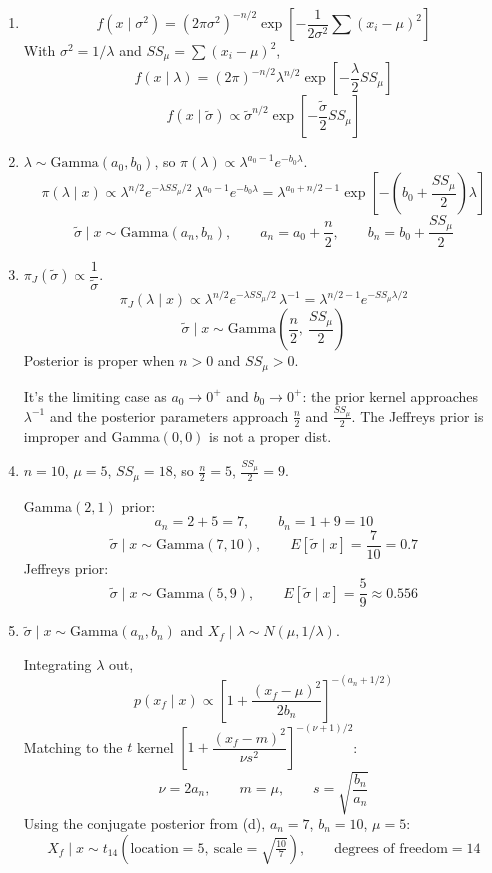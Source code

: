 \documentclass[11pt]{article}
\begin{document}
\begin{enumerate}
\item
\[
f(x \mid \sigma^2) = (2\pi\sigma^2)^{-n/2}\exp\left[-\frac{1}{2\sigma^2}\sum (x_i - \mu)^2\right]
\]
With $\sigma^2 = 1/\lambda$ and $SS_\mu = \sum (x_i - \mu)^2$,
\[
f(x \mid \lambda) = (2\pi)^{-n/2}\lambda^{n/2}\exp\left[-\frac{\lambda}{2}SS_\mu\right]
\]
\[
\boxed{f(x \mid \tilde\sigma) \propto \tilde\sigma^{n/2}\exp\left[-\frac{\tilde\sigma}{2}SS_\mu\right]}
\]

\item $\lambda \sim \text{Gamma}(a_0, b_0)$, so $\pi(\lambda) \propto \lambda^{a_0 - 1}e^{-b_0\lambda}$.
\[
\pi(\lambda \mid x) \propto \lambda^{n/2}e^{-\lambda SS_\mu/2}\,\lambda^{a_0-1}e^{-b_0\lambda}
= \lambda^{a_0 + n/2 - 1}\exp\left[-\left(b_0 + \frac{SS_\mu}{2}\right)\lambda\right]
\]
\[
\tilde\sigma \mid x \sim \text{Gamma}(a_n, b_n), \qquad
\boxed{a_n = a_0 + \frac{n}{2}, \qquad b_n = b_0 + \frac{SS_\mu}{2}}
\]

\item $\pi_J(\tilde\sigma) \propto \dfrac{1}{\tilde\sigma}$.
\[
\pi_J(\lambda \mid x) \propto \lambda^{n/2}e^{-\lambda SS_\mu/2}\,\lambda^{-1} = \lambda^{n/2 - 1}e^{-SS_\mu\lambda/2}
\]
\[
\boxed{\tilde\sigma \mid x \sim \text{Gamma}\left(\frac{n}{2},\ \frac{SS_\mu}{2}\right)}
\]
Posterior is proper when $n > 0$ and $SS_\mu > 0$.

It's the limiting case as $a_0 \to 0^+$ and $b_0 \to 0^+$: the prior kernel approaches $\lambda^{-1}$ and the posterior parameters approach $\frac{n}{2}$ and $\frac{SS_\mu}{2}$. The Jeffreys prior is improper and Gamma$(0,0)$ is not a proper dist.

\item $n = 10$, $\mu = 5$, $SS_\mu = 18$, so $\frac{n}{2} = 5$, $\frac{SS_\mu}{2} = 9$.

Gamma$(2,1)$ prior:
\[
a_n = 2 + 5 = 7, \qquad b_n = 1 + 9 = 10
\]
\[
\boxed{\tilde\sigma \mid x \sim \text{Gamma}(7, 10)}, \qquad \boxed{E[\tilde\sigma \mid x] = \frac{7}{10} = 0.7}
\]
Jeffreys prior:
\[
\boxed{\tilde\sigma \mid x \sim \text{Gamma}(5, 9)}, \qquad \boxed{E[\tilde\sigma \mid x] = \frac{5}{9} \approx 0.556}
\]

\item $\tilde\sigma \mid x \sim \text{Gamma}(a_n, b_n)$ and $X_f \mid \lambda \sim N(\mu, 1/\lambda)$.

Integrating $\lambda$ out,
\[
p(x_f \mid x) \propto \left[1 + \frac{(x_f - \mu)^2}{2b_n}\right]^{-(a_n + 1/2)}
\]
Matching to the $t$ kernel $\left[1 + \dfrac{(x_f - m)^2}{\nu s^2}\right]^{-(\nu+1)/2}$:
\[
\boxed{\nu = 2a_n, \qquad m = \mu, \qquad s = \sqrt{\frac{b_n}{a_n}}}
\]
Using the conjugate posterior from (d), $a_n = 7$, $b_n = 10$, $\mu = 5$:
\[
\boxed{X_f \mid x \sim t_{14}\left(\text{location} = 5,\ \text{scale} = \sqrt{\tfrac{10}{7}}\right)}, \qquad \text{degrees of freedom} = 14
\]
\end{enumerate}
\end{document}
